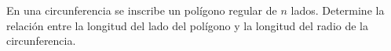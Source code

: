 En una circunferencia se inscribe un polígono regular de $ n $ lados. Determine la relación entre la longitud del lado del polígono y la longitud del radio de la circunferencia.
